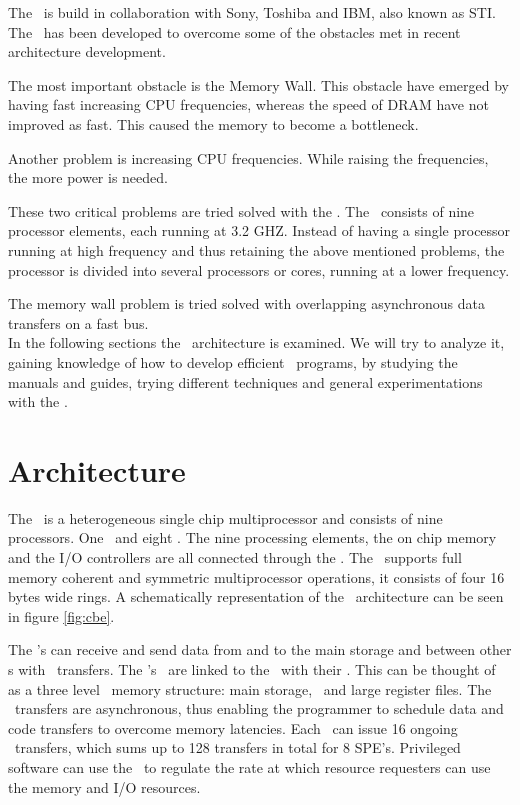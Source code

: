 The \CBE\ is build in collaboration with Sony, Toshiba and IBM, also
known as STI. The \CBE\ has been developed to overcome some of the
obstacles met in recent architecture development.

The most important obstacle is the Memory Wall\cite{memwall94}. This
obstacle have emerged by having fast increasing CPU frequencies,
whereas the speed of DRAM have not improved as fast. This caused the
memory to become a bottleneck.

Another problem is increasing CPU frequencies. While raising the
frequencies, the more power is needed.

These two critical problems are tried solved with the \CBE{}. The
\CBE\ consists of nine processor elements, each running at 3.2
GHZ. Instead of having a single processor running at high frequency
and thus retaining the above mentioned problems, the processor is
divided into several processors or cores, running at a lower
frequency.

The memory wall problem is tried solved with overlapping asynchronous
data transfers on a fast bus.\\

In the following sections the \CBE\ architecture is examined. We will
try to analyze it, gaining knowledge of how to develop efficient \CBE\
programs, by studying the manuals and guides, trying different
techniques and general experimentations with the \CBE{}.

\section{Architecture}
\label{sec:cbe}

The \CBE\ is a heterogeneous single chip multiprocessor and consists
of nine processors. One \PPE\ and eight \SPEv{'s}. The nine processing
elements, the on chip memory and the I/O controllers are all connected
through the \EIB{}. The \EIB\ supports full memory coherent and
symmetric multiprocessor operations, it consists of four 16 bytes wide
rings. A schematically representation of the \CBE\ architecture can be
seen in figure \ref{fig:cbe}.

The \SPE{}'s can receive and send data from and to the main storage
and between other \SPE{}s with \DMA\ transfers. The \SPE{}'s \LS\ are
linked to the \EIB\ with their \MFC{}. This can be thought of as a three
level
\SPE\ memory structure: main storage, \LS\ and large register
files. The \DMA\ transfers are asynchronous, thus enabling the
programmer to schedule data and code transfers to overcome memory
latencies. Each \SPE\ can issue 16 ongoing \DMA\ transfers, which sums
up to 128 transfers in total for 8 SPE's. Privileged software can use
the
\RAM\ to regulate the rate at which resource requesters can use the
memory and I/O resources.


